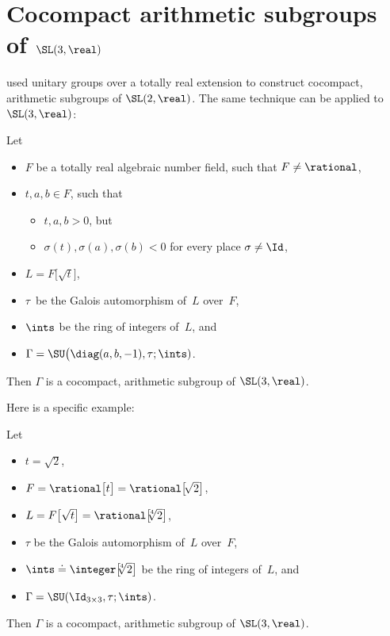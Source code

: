 \section{Cocompact arithmetic subgroups of \texorpdfstring{$\SL(3,\real)$}{SL(3,R)}}\label{CocpctLattSL3R}

 used unitary groups over a totally real extension to construct cocompact, arithmetic subgroups of $\SL(2,\real)$. The same technique can be applied to $\SL(3,\real)$:

\begin{prop} \label{CocpctSL3RSU}
 Let
 \begin{itemize}
 \item $F$ be a totally real algebraic number field, such that $F \neq \rational$,
 \item $t,a,b \in F$, such that
 	\begin{itemize}
	\item $t, a, b > 0$,
	but
	\item $\sigma(t), \sigma(a), \sigma(b) < 0$ for every place $\sigma \neq \Id$,
	\end{itemize}
 \item $L = F \bigl[\! \sqrt{t}\bigr]$,
 \item $\tau$~be the Galois automorphism of~$L$ over~$F$,
 \item $\ints$ be the ring of integers of~$L$, and
 \item $\Gamma = \SU \bigl( \diag(a,b,-1), \tau ; \ints)$. 
 \end{itemize}
 Then $\Gamma$ is a cocompact, arithmetic subgroup of\/
$\SL(3,\real)$.
 \end{prop}

Here is a specific example:

\begin{cor} \label{EgCocpctUnitarySL3R}
Let 
	\begin{itemize}
	\item $t = \sqrt{2}$,
	\item $F = \rational \bigl[ t \bigr] = \rational \bigl[\! \sqrt{2} \bigr]$,
	\item $L = F \bigl[ \sqrt{t} \bigr] =  \rational \bigl[ \! \! \root 4 \of {2} \bigr]$,
	\item $\tau$ be the Galois automorphism of~$L$ over~$F$,
	\item $\ints \doteq \integer \bigl[ \! \! \root 4 \of {2}\bigr]$ be the ring of integers of~$L$,
	and
	\item $\Gamma = \SU( \Id_{3 \times 3}, \tau ; \ints )$.
	\end{itemize}
Then\/ $\Gamma$ is a cocompact, arithmetic subgroup of\/ $\SL(3,\real)$.
\end{cor}

